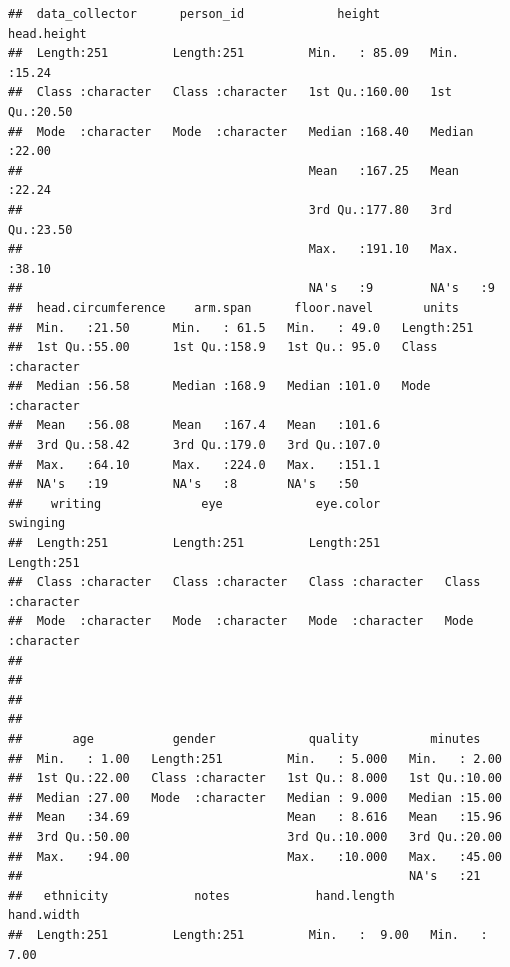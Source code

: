 \documentclass[]{article}
\begin{document}
\begin{verbatim}
##  data_collector      person_id             height        head.height   
##  Length:251         Length:251         Min.   : 85.09   Min.   :15.24  
##  Class :character   Class :character   1st Qu.:160.00   1st Qu.:20.50  
##  Mode  :character   Mode  :character   Median :168.40   Median :22.00  
##                                        Mean   :167.25   Mean   :22.24  
##                                        3rd Qu.:177.80   3rd Qu.:23.50  
##                                        Max.   :191.10   Max.   :38.10  
##                                        NA's   :9        NA's   :9      
##  head.circumference    arm.span      floor.navel       units          
##  Min.   :21.50      Min.   : 61.5   Min.   : 49.0   Length:251        
##  1st Qu.:55.00      1st Qu.:158.9   1st Qu.: 95.0   Class :character  
##  Median :56.58      Median :168.9   Median :101.0   Mode  :character  
##  Mean   :56.08      Mean   :167.4   Mean   :101.6                     
##  3rd Qu.:58.42      3rd Qu.:179.0   3rd Qu.:107.0                     
##  Max.   :64.10      Max.   :224.0   Max.   :151.1                     
##  NA's   :19         NA's   :8       NA's   :50                        
##    writing              eye             eye.color           swinging        
##  Length:251         Length:251         Length:251         Length:251        
##  Class :character   Class :character   Class :character   Class :character  
##  Mode  :character   Mode  :character   Mode  :character   Mode  :character  
##                                                                             
##                                                                             
##                                                                             
##                                                                             
##       age           gender             quality          minutes     
##  Min.   : 1.00   Length:251         Min.   : 5.000   Min.   : 2.00  
##  1st Qu.:22.00   Class :character   1st Qu.: 8.000   1st Qu.:10.00  
##  Median :27.00   Mode  :character   Median : 9.000   Median :15.00  
##  Mean   :34.69                      Mean   : 8.616   Mean   :15.96  
##  3rd Qu.:50.00                      3rd Qu.:10.000   3rd Qu.:20.00  
##  Max.   :94.00                      Max.   :10.000   Max.   :45.00  
##                                                      NA's   :21     
##   ethnicity            notes            hand.length       hand.width   
##  Length:251         Length:251         Min.   :  9.00   Min.   : 7.00  

\end{verbatim}
\end{document}
